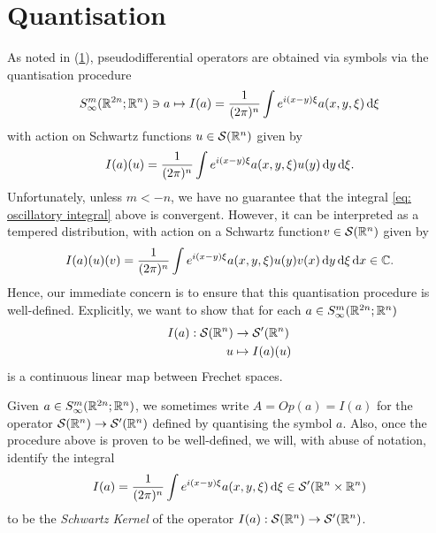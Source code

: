 \documentclass[12pt]{article}
\begin{document}
\section{Quantisation}
As noted in (\ref{}), pseudodifferential operators are obtained via symbols via the quantisation procedure
\begin{align}
    S^{m}_\infty(\R^{2n}; \R^n) \ni a \mapsto I(a) = \frac{1}{(2\pi)^n} \int e^{i(x- y)\xi} a(x, y, \xi) \d[\xi]
\end{align}
with action on Schwartz functions $u \in \sch(\R^n)$ given by 
\begin{align} \label{eq: oscillatory integral}
    I(a)(u) =  \frac{1}{(2\pi)^n} \int e^{i(x- y)\xi} a(x, y, \xi) u(y) \d[y] \d[\xi]. 
\end{align}
Unfortunately, unless $m < -n$, we have no guarantee that the integral \ref{eq: oscillatory integral} above is convergent. However, it can be interpreted as a tempered distribution, with action on a Schwartz function$ v \in \sch(\R^n)$ given by 
\begin{align}
    I(a)(u)(v) = \frac{1}{(2\pi)^n} \int e^{i(x- y)\xi} a(x, y, \xi) u(y) v(x) \d[y] \d[\xi] \d[x] \in \C.  
\end{align}
Hence, our immediate concern is to ensure that this quantisation procedure is well-defined. Explicitly, we want to show that for each $a \in S^{m}_\infty(\R^{2n}; \R^n)$
\begin{align*}
    I(a) : \sch(\R^n) & \to \sch'(\R^n) \\
    u &\mapsto I(a)(u) 
\end{align*}
is a continuous linear map between Frechet spaces. 

\begin{rem}
    Given $a \in S^{m}_\infty(\R^{2n}; \R^n)$, we sometimes write $A = Op(a) = I(a)$ for the operator $\sch(\R^n) \to \sch'(\R^n)$ defined by quantising the symbol $a$. Also, once the procedure above is proven to be well-defined, we will, with abuse of notation, identify the integral
    \begin{align*}
        I(a) = \frac{1}{(2\pi)^n} \int e^{i(x- y)\xi} a(x, y, \xi) \d[\xi] \in \sch'(\R^n\times \R^n)
    \end{align*}
    to be the \textit{Schwartz Kernel} of the operator $I(a): \sch(\R^n) \to \sch'(\R^n)$. 
\end{rem}
\end{document}
